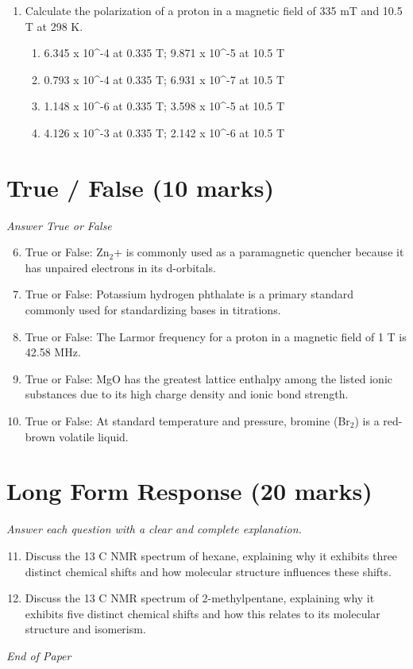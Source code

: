 \documentclass[12pt]{article}
\begin{document}
\begin{enumerate}[label=\arabic*.]
\begin{enumerate}[label=(\alph*)]
\end{enumerate}
\item Calculate the polarization of a proton in a magnetic field of 335 mT and 10.5 T at 298 K.
\begin{enumerate}[label=(\alph*)]
    \item 6.345 x 10^-4 at 0.335 T; 9.871 x 10^-5 at 10.5 T
    \item 0.793 x 10^-4 at 0.335 T; 6.931 x 10^-7 at 10.5 T
    \item 1.148 x 10^-6 at 0.335 T; 3.598 x 10^-5 at 10.5 T
    \item 4.126 x 10^-3 at 0.335 T; 2.142 x 10^-6 at 10.5 T
\end{enumerate}
\end{enumerate}

\section*{True / False (10 marks)}
\textit{Answer True or False}
\begin{enumerate}[label=\arabic*.]
\setcounter{enumi}{5}
\item True or False: Zn$_{2}$+ is commonly used as a paramagnetic quencher because it has unpaired electrons in its d-orbitals.
\item True or False: Potassium hydrogen phthalate is a primary standard commonly used for standardizing bases in titrations.
\item True or False: The Larmor frequency for a proton in a magnetic field of 1 T is 42.58 MHz.
\item True or False: MgO has the greatest lattice enthalpy among the listed ionic substances due to its high charge density and ionic bond strength.
\item True or False: At standard temperature and pressure, bromine (Br$_{2}$) is a red-brown volatile liquid.
\end{enumerate}

\section*{Long Form Response (20 marks)}
\textit{Answer each question with a clear and complete explanation.}
\begin{enumerate}[label=\arabic*.]
\setcounter{enumi}{10}
\item Discuss the 13 C NMR spectrum of hexane, explaining why it exhibits three distinct chemical shifts and how molecular structure influences these shifts.
\item Discuss the 13 C NMR spectrum of 2-methylpentane, explaining why it exhibits five distinct chemical shifts and how this relates to its molecular structure and isomerism.
\end{enumerate}

\vfill
\noindent\textit{End of Paper}
\end{document}
